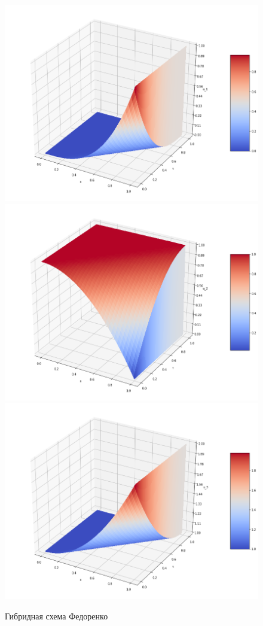 \documentclass[a4paper,14pt]{article}
\begin{document}
\begin{figure}[h]
		\begin{center}
			\includegraphics[scale=0.35]{graph4}
			\includegraphics[scale=0.35]{graph5}      
			\includegraphics[scale=0.35]{graph6}
			\caption{Гибридная схема Федоренко}           
		\end{center}
	\end{figure}
\end{document}
